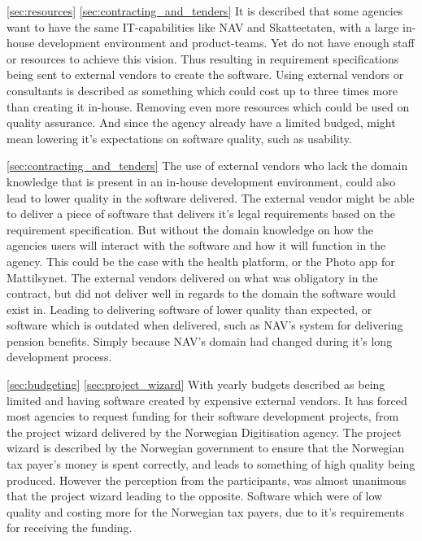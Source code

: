 \autoref{sec:resources} \autoref{sec:contracting_and_tenders} It is described that some agencies want to have the same IT-capabilities like NAV and Skatteetaten, with a large in-house development environment and product-teams. Yet do not have enough staff or resources to achieve this vision. Thus resulting in requirement specifications being sent to external vendors to create the software. Using external vendors or consultants is described as something which could cost up to three times more than creating it in-house. Removing even more resources which could be used on quality assurance. And since the agency already have a limited budged, might mean lowering it's expectations on software quality, such as usability.

\autoref{sec:contracting_and_tenders} The use of external vendors who lack the domain knowledge that is present in an in-house development environment, could also lead to lower quality in the software delivered. The external vendor might be able to deliver a piece of software that delivers it's legal requirements based on the requirement specification. But without the domain knowledge on how the agencies users will interact with the software and how it will function in the agency. This could be the case with the health platform, or the Photo app for Mattilsynet. The external vendors delivered on what was obligatory in the contract, but did not deliver well in regards to the domain the software would exist in. Leading to delivering software of lower quality than expected, or software which is outdated when delivered, such as NAV's system for delivering pension benefits. Simply because NAV's domain had changed during it's long development process.

\autoref{sec:budgeting} \autoref{sec:project_wizard} With yearly budgets described as being limited and having software created by expensive external vendors. It has forced most agencies to request funding for their software development projects, from the project wizard delivered by the Norwegian Digitisation agency. The project wizard is described by the Norwegian government to ensure that the Norwegian tax payer's money is spent correctly, and leads to something of high quality being produced. However the perception from the participants, was almost unanimous that the project wizard leading to the opposite. Software which were of low quality and costing more for the Norwegian tax payers, due to it's requirements for receiving the funding.

